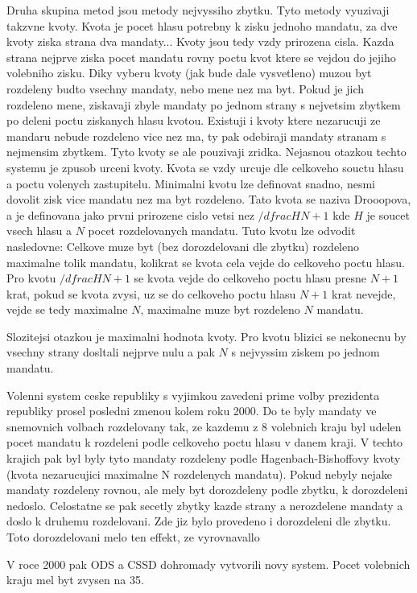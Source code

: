 \documentclass[12pt,a4paper]{article}
\begin{document}
Druha skupina metod jsou metody nejvyssiho zbytku. Tyto metody vyuzivaji takzvne kvoty. Kvota je pocet hlasu potrebny k zisku jednoho mandatu, za dve kvoty ziska strana dva mandaty... Kvoty jsou tedy vzdy prirozena cisla. Kazda strana nejprve ziska pocet mandatu rovny poctu kvot ktere se vejdou do jejiho volebniho zisku. Diky vyberu kvoty (jak bude dale vysvetleno) muzou byt rozdeleny budto vsechny mandaty, nebo mene nez ma byt. Pokud je jich rozdeleno mene, ziskavaji zbyle mandaty po jednom strany s nejvetsim zbytkem po deleni poctu ziskanych hlasu kvotou. Existuji i kvoty ktere nezarucuji ze mandaru nebude rozdeleno vice nez ma, ty pak odebiraji mandaty stranam s nejmensim zbytkem. Tyto kvoty se ale pouzivaji zridka.
Nejasnou otazkou techto systemu je zpusob urceni kvoty. Kvota se vzdy urcuje dle celkoveho souctu hlasu a poctu volenych zastupitelu. Minimalni kvotu lze definovat snadno, nesmi dovolit zisk vice mandatu nez ma byt rozdeleno. Tato kvota se naziva Drooopova, a je definovana jako prvni prirozene cislo vetsi nez $/dfrac{H}{N+1}$ kde $H$ je soucet vsech hlasu a $N$ pocet rozdelovanych mandatu. Tuto kvotu lze odvodit nasledovne: Celkove muze byt (bez dorozdelovani dle zbytku) rozdeleno maximalne tolik mandatu, kolikrat se kvota cela vejde do celkoveho poctu hlasu. Pro kvotu $/dfrac{H}{N+1}$ se kvota vejde do celkoveho poctu hlasu presne $N+1$ krat, pokud se kvota zvysi, uz se do celkoveho poctu hlasu $N+1$ krat nevejde, vejde se tedy maximalne $N$, maximalne muze byt rozdeleno $N$ mandatu.

Slozitejsi otazkou je maximalni hodnota kvoty. Pro kvotu blizici se nekonecnu by vsechny strany dosltali nejprve nulu a pak $N$ s nejvyssim ziskem po jednom mandatu.

Volenni system ceske republiky s vyjimkou zavedeni prime volby prezidenta republiky prosel posledni zmenou kolem roku 2000. Do te byly mandaty ve snemovnich volbach rozdelovany tak, ze kazdemu z 8 volebnich kraju byl udelen pocet mandatu k rozdeleni podle celkoveho poctu hlasu v danem kraji. V techto krajich pak byl byly tyto mandaty rozdeleny podle Hagenbach-Bishoffovy kvoty (kvota nezarucujici maximalne N rozdelenych mandatu). Pokud nebyly nejake mandaty rozdeleny rovnou, ale mely byt dorozdeleny podle zbytku, k dorozdeleni nedoslo. Celostatne se pak secetly zbytky kazde strany a nerozdelene mandaty a doslo k druhemu rozdelovani. Zde jiz bylo provedeno i dorozdeleni dle zbytku. Toto dorozdelovani melo ten effekt, ze vyrovnavallo %

V roce 2000 pak ODS a CSSD dohromady vytvorili novy system. Pocet volebnich kraju mel byt zvysen na 35. 
\end{document}
